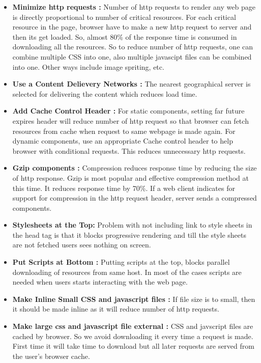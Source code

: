 \documentclass[conference]{IEEEtran}
\begin{document}
\begin{itemize}
\item \textbf{Minimize http requests :}
Number of http requests to render any web page is directly proportional to
number of critical resources.
For each critical resource in the page, browser have to make a new http request 
to server and then its get loaded. So, almost 80\% of the response time is
consumed in downloading all the resources. So to reduce number of http
requests, one can combine multiple CSS into one, also multiple javascipt files can
be combined into one. Other ways include image spriting, etc.

\item \textbf{Use a Content Delievery Networks :}
The nearest geographical server is selected for delivering the content which reduces load time.

\item \textbf{Add Cache Control Header :}
For static components, setting far future expires header will reduce number of http request
so that browser can fetch resources from cache when request to same webpage is made again.
For dynamic components, use an appropriate Cache control header to help browser
with conditional requests. This reduces unnecessary http requests.

\item \textbf{Gzip components :}
Compression reduces response time by reducing the size of http response.
Gzip is most popular and effective compression method at this time. It reduces
response time by 70\%. If a web client indicates for support for compression in
the http request header, server sends a compressed components.

\item \textbf{Stylesheets at the Top: }
Problem with not including link to style sheets in the head tag is that it blocks
progressive rendering and till the style sheets are not fetched users sees nothing
on screen.

\item \textbf{Put Scripts at Bottom :}
Putting scripts at the top, blocks parallel downloading of resources from same host.
In most of the cases scripts are needed when users starts interacting with the web page. 

\item \textbf{Make Inline Small CSS and javascript files :}
If file size is to small, then it should be made inline as it will reduce number
of http requests.

\item \textbf{Make large css and javascript file external :}
CSS and javscript files are cached by browser. So we avoid downloading it every time a request is made.
First time it will take time to download but all later requests are served from the user's browser cache.


\end{itemize}
\end{document}
